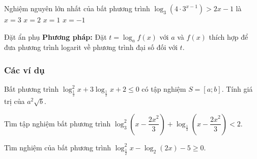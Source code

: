 \begin{ex}%
	Nghiệm nguyên lớn nhất của bất phương trình $\log_3\left({4\cdot 3}^{x-1}\right)>2x-1$ là 
	\choice
	{$x=3$}
	{$x=2$}
	{\True $x=1$}
	{$x=-1$}
\end{ex}
\begin{dang}{Đặt ẩn phụ}
	\textbf{Phương pháp:} Đặt $t=\log_af(x)$ với $a$ và $f(x)$ thích hợp để đưa phương trình logarit về phương trình đại số đối với $t$.
\end{dang}
\subsubsection{Các ví dụ}
\begin{vd}%
	Bất phương trình $\log_{\tfrac{1}{2}}^2x+3\log_{\tfrac{1}{2}}x+2\leq 0$ có tập nghiệm $S=[a;b]$. Tính giá trị của $a^2\sqrt{b}$.
\end{vd}
\begin{vd}%
	Tìm tập nghiệm bất phương trình $\log^2_3\left(x-\dfrac{2x^2}{3}\right)+\log_{\tfrac{1}{3}}\left(x-\dfrac{2x^2}{3}\right)<2$.
\end{vd}
\begin{vd}%
	Tìm nghiệm của bất phương trình $\log^2_{\tfrac{1}{2}}x-\log_2(2x)-5\geq 0$.
\end{vd}

